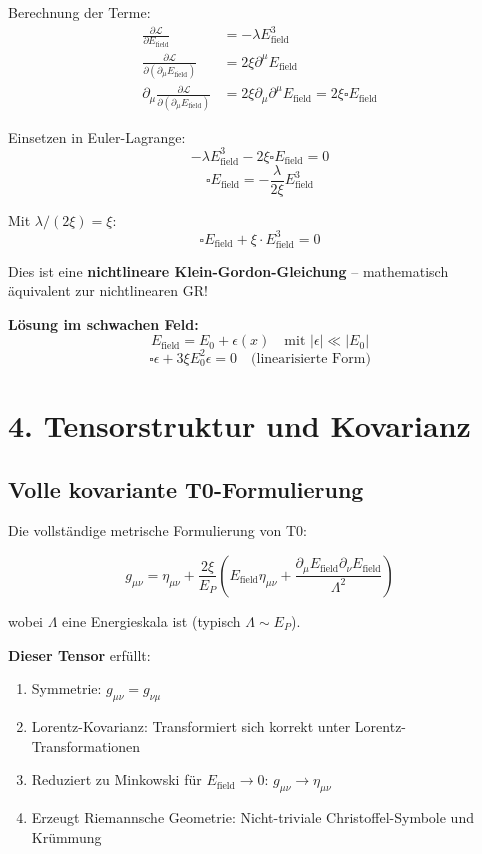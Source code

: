 	Berechnung der Terme:
	\begin{align*}
		\frac{\partial \mathcal{L}}{\partial E_{\text{field}}} &= -\lambda E_{\text{field}}^3 \\
		\frac{\partial \mathcal{L}}{\partial(\partial_\mu E_{\text{field}})} &= 2\xi \partial^\mu E_{\text{field}} \\
		\partial_\mu \frac{\partial \mathcal{L}}{\partial(\partial_\mu E_{\text{field}})} &= 2\xi \partial_\mu \partial^\mu E_{\text{field}} = 2\xi \square E_{\text{field}}
	\end{align*}
	
	Einsetzen in Euler-Lagrange:
	\[
	-\lambda E_{\text{field}}^3 - 2\xi \square E_{\text{field}} = 0
	\]
	\[
	\square E_{\text{field}} = -\frac{\lambda}{2\xi} E_{\text{field}}^3
	\]
	
	Mit $\lambda/(2\xi) = \xi$:
	\[
	\boxed{\square E_{\text{field}} + \xi \cdot E_{\text{field}}^3 = 0}
	\]
	
	Dies ist eine \textbf{nichtlineare Klein-Gordon-Gleichung} -- mathematisch äquivalent zur nichtlinearen GR!
	
	\textbf{Lösung im schwachen Feld:}
	\[
	E_{\text{field}} = E_0 + \epsilon(x) \quad \text{mit } |\epsilon| \ll |E_0|
	\]
	\[
	\square \epsilon + 3\xi E_0^2 \epsilon = 0 \quad \text{(linearisierte Form)}
	\]
	
	\section*{4. Tensorstruktur und Kovarianz}
	
	\subsection*{\textbf{Volle kovariante T0-Formulierung}}
	
	Die vollständige metrische Formulierung von T0:
	
	\[
	g_{\mu\nu} = \eta_{\mu\nu} + \frac{2\xi}{E_P} \left(E_{\text{field}} \eta_{\mu\nu} + \frac{\partial_\mu E_{\text{field}} \partial_\nu E_{\text{field}}}{\Lambda^2}\right)
	\]
	
	wobei $\Lambda$ eine Energieskala ist (typisch $\Lambda \sim E_P$).
	
	\textbf{Dieser Tensor} erfüllt:
	\begin{enumerate}[label=\checkmark]
		\item Symmetrie: $g_{\mu\nu} = g_{\nu\mu}$
		\item Lorentz-Kovarianz: Transformiert sich korrekt unter Lorentz-Transformationen
		\item Reduziert zu Minkowski für $E_{\text{field}} \to 0$: $g_{\mu\nu} \to \eta_{\mu\nu}$
		\item Erzeugt Riemannsche Geometrie: Nicht-triviale Christoffel-Symbole und Krümmung
	\end{enumerate}
	
